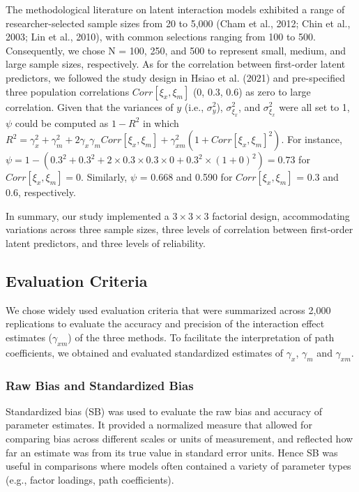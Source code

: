 \documentclass[
  man]{apa6}
\begin{document}
The methodological literature on latent interaction models exhibited a range of researcher-selected sample sizes from 20 to 5,000 (Cham et al., 2012; Chin et al., 2003; Lin et al., 2010), with common selections ranging from 100 to 500. Consequently, we chose N = 100, 250, and 500 to represent small, medium, and large sample sizes, respectively. As for the correlation between first-order latent predictors, we followed the study design in Hsiao et al. (2021) and pre-specified three population correlations \(Corr[{\xi_{x},\xi_{m}}]\) (0, 0.3, 0.6) as zero to large correlation. Given that the variances of \(y\) (i.e., \(\sigma_{y}^2\)), \(\sigma_{\xi_{x}}^2\), and \(\sigma_{\xi_{x}}^2\) were all set to 1, \(\psi\) could be computed as \(1 - R^2\) in which \(R^2 = \gamma_{x}^2 + \gamma_{m}^2 + 2\gamma_{x}\gamma_{m}Corr[{\xi_{x},\xi_{m}}] + \gamma_{xm}^2(1 + Corr[{\xi_{x},\xi_{m}}]^2)\). For instance, \(\psi = 1 - (0.3^2 + 0.3^2 + 2\times0.3\times0.3\times0 + 0.3^2\times(1 + 0)^2) = 0.73\) for \(Corr[{\xi_{x},\xi_{m}}] = 0\). Similarly, \(\psi\) = 0.668 and 0.590 for \(Corr[{\xi_{x},\xi_{m}}]\) = 0.3 and 0.6, respectively.

In summary, our study implemented a \(3 \times 3 \times 3\) factorial design, accommodating variations across three sample sizes, three levels of correlation between first-order latent predictors, and three levels of reliability.

\subsection{Evaluation Criteria}\label{evaluation-criteria}

We chose widely used evaluation criteria that were summarized across 2,000 replications to evaluate the accuracy and precision of the interaction effect estimates (\(\gamma_{xm}\)) of the three methods. To facilitate the interpretation of path coefficients, we obtained and evaluated standardized estimates of \(\gamma_{x}\), \(\gamma_{m}\) and \(\gamma_{xm}\).

\subsubsection{Raw Bias and Standardized Bias}\label{raw-bias-and-standardized-bias}

Standardized bias (SB) was used to evaluate the raw bias and accuracy of parameter estimates. It provided a normalized measure that allowed for comparing bias across different scales or units of measurement, and reflected how far an estimate was from its true value in standard error units. Hence SB was useful in comparisons where models often contained a variety of parameter types (e.g., factor loadings, path coefficients).
\end{document}
